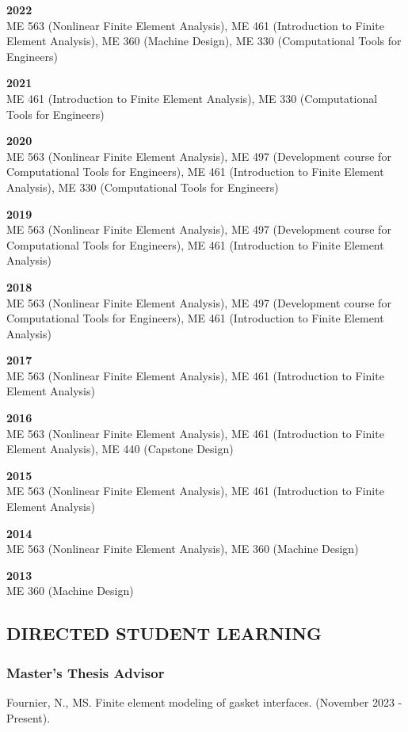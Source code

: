 \documentclass[a4paper,10pt]{article}
\begin{document}
\textbf{2022}\\
ME 563 (Nonlinear Finite Element Analysis), ME 461 (Introduction to Finite Element Analysis), ME 360 (Machine Design), ME 330 (Computational Tools for Engineers)

\textbf{2021}\\
ME 461 (Introduction to Finite Element Analysis), ME 330 (Computational Tools for Engineers)

\textbf{2020}\\
ME 563 (Nonlinear Finite Element Analysis), ME 497 (Development course for Computational Tools for Engineers), ME 461 (Introduction to Finite Element Analysis), ME 330 (Computational Tools for Engineers)

\textbf{2019}\\
ME 563 (Nonlinear Finite Element Analysis), ME 497 (Development course for Computational Tools for Engineers), ME 461 (Introduction to Finite Element Analysis)

\textbf{2018}\\
ME 563 (Nonlinear Finite Element Analysis), ME 497 (Development course for Computational Tools for Engineers), ME 461 (Introduction to Finite Element Analysis)

\textbf{2017}\\
ME 563 (Nonlinear Finite Element Analysis), ME 461 (Introduction to Finite Element Analysis)

\textbf{2016}\\
ME 563 (Nonlinear Finite Element Analysis), ME 461 (Introduction to Finite Element Analysis), ME 440 (Capstone Design)

\textbf{2015}\\
ME 563 (Nonlinear Finite Element Analysis), ME 461 (Introduction to Finite Element Analysis)

\textbf{2014}\\
ME 563 (Nonlinear Finite Element Analysis), ME 360 (Machine Design)

\textbf{2013}\\
ME 360 (Machine Design)

\subsection*{DIRECTED STUDENT LEARNING}

\subsubsection*{Master's Thesis Advisor}
Fournier, N., MS. Finite element modeling of gasket interfaces. (November 2023 - Present).
\end{document}
